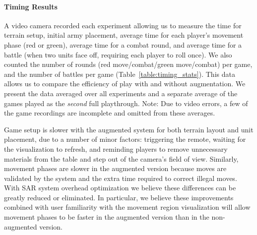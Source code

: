 \documentclass[10pt,twocolumn,letterpaper]{article}
\begin{document}
\vspace{-0.15in}
\paragraph{Timing Results}


A video camera recorded each experiment
allowing us to measure the time for terrain setup, initial army
placement, average time for each player's movement phase (red or
green), average time for a combat round, and average time for a battle
(when two units face off, requiring each player to roll once).  We
also counted the number of rounds (red move/combat/green move/combat)
per game, and the number of battles per game
(Table~\ref{table:timing_stats}).  This data allows us to compare the
efficiency of play with and without augmentation.  We present the
data averaged over all experiments and a separate average of the games
played as the {\em second} full playthrough.
Note: Due to video errors,
a few of the game recordings are incomplete and 
omitted from these averages.

Game setup is slower with the augmented system for both terrain layout
and unit placement,
due to a number of minor factors: triggering the remote, waiting for
the visualization to refresh, and reminding players to remove
unnecessary materials from the table and step out of the camera's
field of view.  Similarly, movement phases are slower in the augmented
version because moves are validated by the system and the extra time 
required to correct illegal moves.  With SAR system
overhead optimization we believe these differences can be greatly
reduced or eliminated.  In particular, we believe these improvements
combined with user familiarity with the movement region visualization
will allow movement phases to be faster in the augmented version than
in the non-augmented version.
\end{document}
